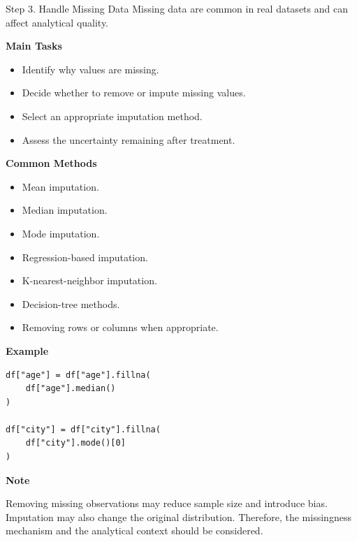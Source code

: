 \documentclass[aspectratio=169,11pt]{beamer}
\begin{document}
\begin{frame}{Step 3. Handle Missing Data}
\footnotesize
Missing data are common in real datasets and can affect analytical quality.\par\medskip
\textbf{Main Tasks}\par\medskip
\begin{itemize}
\item Identify why values are missing.
\item Decide whether to remove or impute missing values.
\item Select an appropriate imputation method.
\item Assess the uncertainty remaining after treatment.
\end{itemize}
\textbf{Common Methods}\par\medskip
\begin{itemize}
\item Mean imputation.
\item Median imputation.
\item Mode imputation.
\item Regression-based imputation.
\item K-nearest-neighbor imputation.
\item Decision-tree methods.
\item Removing rows or columns when appropriate.
\end{itemize}
\textbf{Example}\par\medskip
\begin{lstlisting}[style=py]
df["age"] = df["age"].fillna(
    df["age"].median()
)

df["city"] = df["city"].fillna(
    df["city"].mode()[0]
)
\end{lstlisting}
\textbf{Note}\par\medskip
Removing missing observations may reduce sample size and introduce bias. Imputation may also change the original distribution. Therefore, the missingness mechanism and the analytical context should be considered.\par\medskip
\end{frame}
\end{document}
